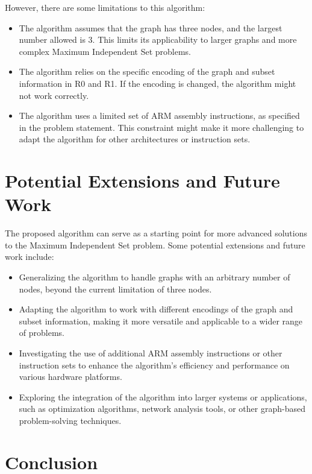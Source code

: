 However, there are some limitations to this algorithm:

\begin{itemize}
  \item The algorithm assumes that the graph has three nodes, and the largest number allowed is 3. This limits its applicability to larger graphs and more complex Maximum Independent Set problems.
  \item The algorithm relies on the specific encoding of the graph and subset information in R0 and R1. If the encoding is changed, the algorithm might not work correctly.
  \item The algorithm uses a limited set of ARM assembly instructions, as specified in the problem statement. This constraint might make it more challenging to adapt the algorithm for other architectures or instruction sets.
\end{itemize}

\section{Potential Extensions and Future Work}

The proposed algorithm can serve as a starting point for more advanced solutions to the Maximum Independent Set problem. Some potential extensions and future work include:

\begin{itemize}
  \item Generalizing the algorithm to handle graphs with an arbitrary number of nodes, beyond the current limitation of three nodes.
  \item Adapting the algorithm to work with different encodings of the graph and subset information, making it more versatile and applicable to a wider range of problems.
  \item Investigating the use of additional ARM assembly instructions or other instruction sets to enhance the algorithm's efficiency and performance on various hardware platforms.
  \item Exploring the integration of the algorithm into larger systems or applications, such as optimization algorithms, network analysis tools, or other graph-based problem-solving techniques.
\end{itemize}

\section{Conclusion}
\label{sec:conclusion}

